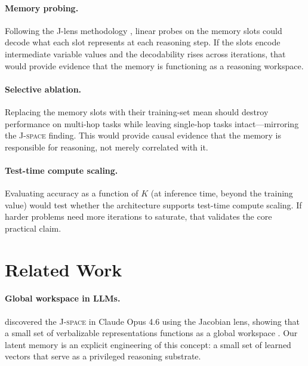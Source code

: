 \documentclass[11pt,a4paper]{article}
\newcommand{\jspace}{\textsc{J-space}}
\begin{document}
\paragraph{Memory probing.}
Following the J-lens methodology \citep{anthropic2026jspace}, linear probes on the memory slots could decode what each slot represents at each reasoning step. If the slots encode intermediate variable values and the decodability rises across iterations, that would provide evidence that the memory is functioning as a reasoning workspace.

\paragraph{Selective ablation.}
Replacing the memory slots with their training-set mean should destroy performance on multi-hop tasks while leaving single-hop tasks intact---mirroring the \jspace{} finding. This would provide causal evidence that the memory is responsible for reasoning, not merely correlated with it.

\paragraph{Test-time compute scaling.}
Evaluating accuracy as a function of $K$ (at inference time, beyond the training value) would test whether the architecture supports test-time compute scaling. If harder problems need more iterations to saturate, that validates the core practical claim.

\section{Related Work}
\label{sec:related}

\paragraph{Global workspace in LLMs.}
\citet{anthropic2026jspace} discovered the \jspace{} in Claude Opus 4.6 using the Jacobian lens, showing that a small set of verbalizable representations functions as a global workspace \citep{baars2005global,dehaene2014conscious}. Our latent memory is an explicit engineering of this concept: a small set of learned vectors that serve as a privileged reasoning substrate.
\end{document}
